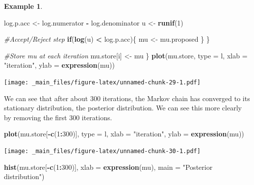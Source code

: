 \documentclass[
]{book}
\newenvironment{Shaded}{\begin{snugshade}}{\end{snugshade}}
\newcommand{\AttributeTok}[1]{\textcolor[rgb]{0.13,0.29,0.53}{#1}}
\newcommand{\CommentTok}[1]{\textcolor[rgb]{0.56,0.35,0.01}{\textit{#1}}}
\newcommand{\ControlFlowTok}[1]{\textcolor[rgb]{0.13,0.29,0.53}{\textbf{#1}}}
\newcommand{\DecValTok}[1]{\textcolor[rgb]{0.00,0.00,0.81}{#1}}
\newcommand{\FunctionTok}[1]{\textcolor[rgb]{0.13,0.29,0.53}{\textbf{#1}}}
\newcommand{\NormalTok}[1]{#1}
\newcommand{\OtherTok}[1]{\textcolor[rgb]{0.56,0.35,0.01}{#1}}
\newcommand{\SpecialCharTok}[1]{\textcolor[rgb]{0.81,0.36,0.00}{\textbf{#1}}}
\newcommand{\StringTok}[1]{\textcolor[rgb]{0.31,0.60,0.02}{#1}}
\theoremstyle{definition}
\theoremstyle{definition}
\newtheorem{example}{Example}[chapter]
\theoremstyle{definition}
\theoremstyle{definition}
\theoremstyle{remark}
\begin{document}
\begin{example}
\begin{Shaded}
\begin{Highlighting}[]
\NormalTok{    log.p.acc }\OtherTok{\textless{}{-}}\NormalTok{ log.numerator }\SpecialCharTok{{-}}\NormalTok{ log.denominator}
\NormalTok{    u }\OtherTok{\textless{}{-}} \FunctionTok{runif}\NormalTok{(}\DecValTok{1}\NormalTok{)}
    
    \CommentTok{\#Accept/Reject step}
    \ControlFlowTok{if}\NormalTok{(}\FunctionTok{log}\NormalTok{(u) }\SpecialCharTok{\textless{}}\NormalTok{ log.p.acc)\{}
\NormalTok{      mu }\OtherTok{\textless{}{-}}\NormalTok{ mu.proposed}
\NormalTok{    \}}
\NormalTok{  \}}
  
  \CommentTok{\#Store mu at each iteration}
\NormalTok{  mu.store[i] }\OtherTok{\textless{}{-}}\NormalTok{ mu}
\NormalTok{\}}
\FunctionTok{plot}\NormalTok{(mu.store, }\AttributeTok{type =} \StringTok{\textquotesingle{}l\textquotesingle{}}\NormalTok{, }\AttributeTok{xlab =} \StringTok{"iteration"}\NormalTok{, }
     \AttributeTok{ylab =} \FunctionTok{expression}\NormalTok{(mu))}
\end{Highlighting}
\end{Shaded}

\texttt{[image: \_main\_files/figure-latex/unnamed-chunk-29-1.pdf]}

We can see that after about 300 iterations, the Markov chain has converged to its stationary distribution, the posterior distribution. We can see this more clearly by removing the first 300 iterations.

\begin{Shaded}
\begin{Highlighting}[]
\FunctionTok{plot}\NormalTok{(mu.store[}\SpecialCharTok{{-}}\FunctionTok{c}\NormalTok{(}\DecValTok{1}\SpecialCharTok{:}\DecValTok{300}\NormalTok{)], }\AttributeTok{type =} \StringTok{\textquotesingle{}l\textquotesingle{}}\NormalTok{, }\AttributeTok{xlab =} \StringTok{"iteration"}\NormalTok{, }\AttributeTok{ylab =} \FunctionTok{expression}\NormalTok{(mu))}
\end{Highlighting}
\end{Shaded}

\texttt{[image: \_main\_files/figure-latex/unnamed-chunk-30-1.pdf]}

\begin{Shaded}
\begin{Highlighting}[]
\FunctionTok{hist}\NormalTok{(mu.store[}\SpecialCharTok{{-}}\FunctionTok{c}\NormalTok{(}\DecValTok{1}\SpecialCharTok{:}\DecValTok{300}\NormalTok{)], }\AttributeTok{xlab =} \FunctionTok{expression}\NormalTok{(mu), }\AttributeTok{main =} \StringTok{"Posterior distribution"}\NormalTok{)}
\end{Highlighting}
\end{Shaded}


\end{example}
\end{document}
